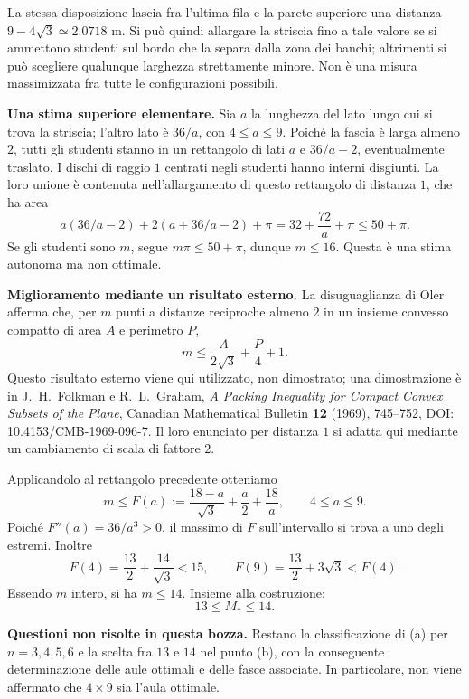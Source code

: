 {La stessa disposizione lascia fra l'ultima fila e la parete superiore
una distanza $9-4\sqrt3\simeq2.0718$ m. Si pu\`o quindi allargare
la striscia fino a tale valore se si ammettono studenti sul bordo
che la separa dalla zona dei banchi; altrimenti si pu\`o scegliere
qualunque larghezza strettamente minore. Non \`e una misura
massimizzata fra tutte le configurazioni possibili.

\textbf{Una stima superiore elementare.}
Sia $a$ la lunghezza del lato lungo cui si trova la striscia;
l'altro lato \`e $36/a$, con $4\le a\le9$. Poich\'e la fascia \`e
larga almeno $2$, tutti gli studenti stanno in un rettangolo di lati
$a$ e $36/a-2$, eventualmente traslato.
I dischi di raggio $1$ centrati negli studenti hanno interni disgiunti.
La loro unione \`e contenuta nell'allargamento di questo rettangolo
di distanza $1$, che ha area
\[
 a(36/a-2)+2(a+36/a-2)+\pi
 =32+\frac{72}{a}+\pi\le50+\pi.
\]
Se gli studenti sono $m$, segue $m\pi\le50+\pi$, dunque $m\le16$.
Questa \`e una stima autonoma ma non ottimale.

\textbf{Miglioramento mediante un risultato esterno.}
La disuguaglianza di Oler afferma che, per $m$ punti a distanze
reciproche almeno $2$ in un insieme convesso compatto di area $A$
e perimetro $P$,
\[
 m\le\frac{A}{2\sqrt3}+\frac P4+1.
\]
Questo risultato esterno viene qui utilizzato, non dimostrato;
una dimostrazione \`e in J.~H.~Folkman e R.~L.~Graham,
\emph{A Packing Inequality for Compact Convex Subsets of the Plane},
Canadian Mathematical Bulletin \textbf{12} (1969), 745--752,
DOI: 10.4153/CMB-1969-096-7. Il loro enunciato per distanza $1$
si adatta qui mediante un cambiamento di scala di fattore $2$.

Applicandolo al rettangolo precedente otteniamo
\[
 m\le F(a):=\frac{18-a}{\sqrt3}+\frac a2+\frac{18}{a},
 \qquad 4\le a\le9.
\]
Poich\'e $F''(a)=36/a^3>0$, il massimo di $F$ sull'intervallo
si trova a uno degli estremi. Inoltre
\[
 F(4)=\frac{13}{2}+\frac{14}{\sqrt3}<15,
 \qquad
 F(9)=\frac{13}{2}+3\sqrt3<F(4).
\]
Essendo $m$ intero, si ha $m\le14$. Insieme alla costruzione:
\[
 \boxed{13\le M_*\le14.}
\]

\textbf{Questioni non risolte in questa bozza.}
Restano la classificazione di (a) per $n=3,4,5,6$ e la scelta fra
$13$ e $14$ nel punto (b), con la conseguente determinazione delle
aule ottimali e delle fasce associate. In particolare, non viene
affermato che $4\times9$ sia l'aula ottimale.
}
\renewcommand{\SoluzioniAlternative}{}
\renewcommand{\Osservazioni}{}
\renewcommand{\Commenti}{}
